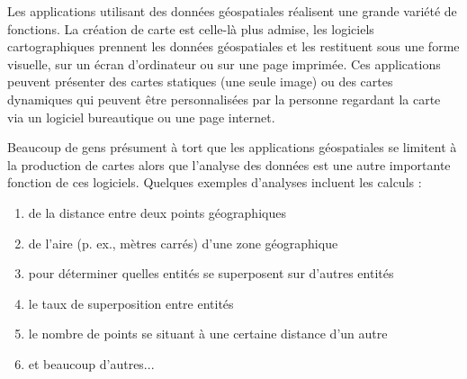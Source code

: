 Les applications utilisant des données géospatiales réalisent une grande variété de fonctions. La création de carte est celle-là plus admise, les logiciels cartographiques prennent les données géospatiales et les restituent sous une forme visuelle, sur un écran d'ordinateur ou sur une page imprimée.
Ces applications peuvent présenter des cartes statiques (une seule image) ou des cartes dynamiques qui peuvent être personnalisées par la personne regardant la carte via un logiciel bureautique ou une page internet.

Beaucoup de gens présument à tort que les applications géospatiales se limitent à la production de cartes alors que l'analyse des données est une autre importante fonction de ces logiciels. Quelques exemples d'analyses incluent les calculs : 


\begin{enumerate} 
\item de la distance entre deux points géographiques  
\item de l'aire (p. ex., mètres carrés) d'une zone géographique 
\item pour déterminer quelles entités se superposent sur d'autres entités 
\item le taux de superposition entre entités 
\item le nombre de points se situant à une certaine distance d'un autre 
\item et beaucoup d'autres...
\end{enumerate} 

%

